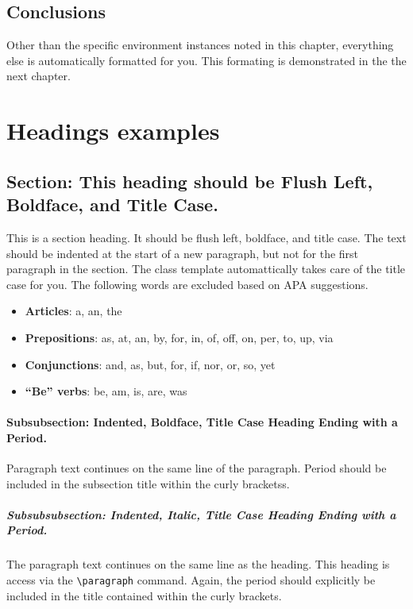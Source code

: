 \documentclass{thesis-dissertation}
\begin{document}
\section{Conclusions}
Other than the specific environment instances noted in this chapter, everything else is automatically formatted for you. This formating is demonstrated in the the next chapter.
\chapter{Headings examples}
\section{Section: This heading should be Flush Left, Boldface, and Title Case.}
This is a section heading. It should be flush left, boldface, and title case. The text should be indented at the start of a new paragraph, but not for the first paragraph in the section. The class template automattically takes care of the title case for you. The following words are excluded based on APA suggestions. 
\begin{itemize}
  \item \textbf{Articles}: a, an, the
  \item \textbf{Prepositions}: as, at, an, by, for, in, of, off, on, per, to, up, via
  \item \textbf{Conjunctions}: and, as, but, for, if, nor, or, so, yet
  \item \textbf{``Be'' verbs}: be, am, is, are, was
\end{itemize}

\subsubsection{Subsubsection: Indented, Boldface, Title Case Heading Ending with a Period.}
Paragraph text continues on the same line of the paragraph. Period should be included in the subsection title within the curly bracketss.

\paragraph{Subsubsubsection: Indented, Italic, Title Case Heading Ending with a Period.} The paragraph text continues on the same line as the heading. This heading is access via the \verb|\paragraph| command. Again, the period should explicitly be included in the title contained within the curly brackets.
\end{document}
